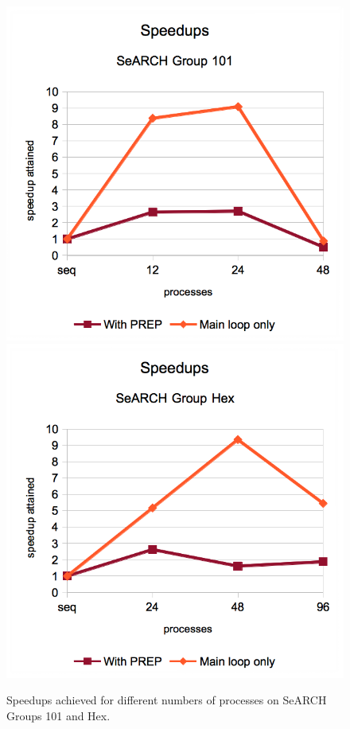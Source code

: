 \begin{figure}
	\begin{center}
		\includegraphics[width=\columnwidth]{report.may/images/speedup101.png}
		\includegraphics[width=\columnwidth]{report.may/images/speeduphex.png}
		\caption[Speedups]{Speedups achieved for different numbers of processes on SeARCH Groups 101 and Hex.}
	\end{center}
	\label{fig:speedup}
\end{figure}

